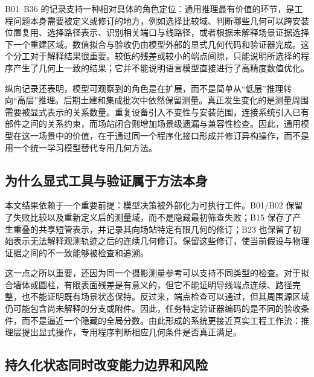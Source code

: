 \documentclass[10pt,a4paper]{article}
\begin{document}
B01--B36
的记录支持一种相对具体的角色定位：通用推理最有价值的环节，是工程问题本身需要被定义或修订的地方，例如选择比较域、判断哪些几何可以跨安装位置复用、选择路径表示、识别相关端口与线路径，或者根据未解释场景证据选择下一个重建区域。数值拟合与验收仍由模型外部的显式几何代码和验证器完成。这个分工对于解释结果很重要。较低的残差或较小的端点间隙，只能说明所选择的程序产生了几何上一致的结果；它并不能说明语言模型直接进行了高精度数值优化。

纵向记录还表明，模型可观察到的角色是在扩展，而不是简单从``低层''推理转向``高层''推理。后期土建和集成批次中依然保留测量。真正发生变化的是测量周围需要被显式表示的关系数量。重复设备引入不变性与安装范围，连接系统引入已有部件之间的关系约束，而场站闭合则增加场景级遗漏与兼容性检查。因此，通用模型在这一场景中的价值，在于通过同一个程序化接口形成并修订异构操作，而不是用一个统一学习模型替代专用几何方法。

\hypertarget{ux4e3aux4ec0ux4e48ux663eux5f0fux5de5ux5177ux4e0eux9a8cux8bc1ux5c5eux4e8eux65b9ux6cd5ux672cux8eab}{%
\subsection{为什么显式工具与验证属于方法本身}\label{ux4e3aux4ec0ux4e48ux663eux5f0fux5de5ux5177ux4e0eux9a8cux8bc1ux5c5eux4e8eux65b9ux6cd5ux672cux8eab}}

本文结果依赖于一个重要前提：模型决策被外部化为可执行工件。B01/B02
保留了失败比较以及重新定义后的测量域，而不是隐藏最初筛查失败；B15
保存了产生重叠的共享短管表示，并记录其向场站特定有限几何的修订；B23
也保留了初始表示无法解释观测轨迹之后的连续几何修订。保留这些修订，使当前假设与物理证据之间的不一致能够被检查和追溯。

这一点之所以重要，还因为同一个摄影测量参考可以支持不同类型的检查。对于拟合墙体或圆柱，有限表面残差是有意义的，但它不能证明导线端点连续、路径完整，也不能证明既有场景状态保持。反过来，端点检查可以通过，但其周围源区域仍可能包含尚未解释的分支或附件。因此，任务特定验证器编码的是不同的验收条件，而不是逼近一个隐藏的全局分数。由此形成的系统更接近真实工程工作流：推理层提出显式操作，专用程序判断相应几何条件是否真正满足。

\hypertarget{ux6301ux4e45ux5316ux72b6ux6001ux540cux65f6ux6539ux53d8ux80fdux529bux8fb9ux754cux548cux98ceux9669}{%
\subsection{持久化状态同时改变能力边界和风险}\label{ux6301ux4e45ux5316ux72b6ux6001ux540cux65f6ux6539ux53d8ux80fdux529bux8fb9ux754cux548cux98ceux9669}}
\end{document}

